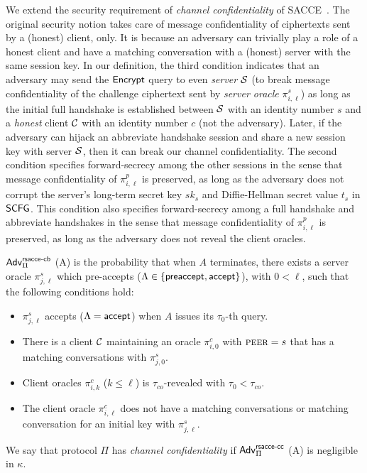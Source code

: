 \begin{remark}
We extend the security requirement of
\textit{channel confidentiality} of SACCE~\cite{KPW13:SACCE}.
The original security notion takes care of message
confidentiality of ciphertexts sent by a (honest)
client, only. It is because an adversary can trivially
play a role of a honest client and have a matching
conversation with a (honest) server with the same
session key. In our definition, the third condition
indicates that an adversary may send the $\mathsf{Encrypt}$
query to even \textit{server} $\mathcal{S}$ (to break
message confidentiality of the challenge ciphertext
sent by \textit{server oracle} $\pi^s_{i,\ell}$) as
long as the initial full handshake is established
between $\mathcal{S}$ with an identity number $s$ and a \textit{honest} client
$\mathcal{C}$ with an identity number $c$ (not the adversary). Later, if the
adversary can hijack an abbreviate handshake session
and share a new session key with server $\mathcal{S}$,
then it can break our channel confidentiality.
The second condition specifies forward-secrecy among
the other sessions in the
sense that message confidentiality of $\pi^p_{i,\ell}$
is preserved, as long as the adversary does not
corrupt the server's long-term secret key $sk_s$ and Diffie-Hellman
secret value $t_s$ in $\mathsf{SCFG}$.
This condition also specifies forward-secrecy among
a full handshake and abbreviate handshakes in the sense
that message confidentiality of $\pi^p_{i,\ell}$ is preserved,
as long as the adversary does not reveal the client oracles.
\end{remark}

\begin{definition} \label{def:rsacce-cb}
 $\mathsf{Adv}^{\mathsf{rsacce\textsc{-} cb}}_{\Pi}$ (A) is the probability that when $A$
 terminates, there exists a server oracle $\pi^s_{j, \ell}$
 which pre-accepts ($\Lambda \in \{\mathsf{preaccept}, \mathsf{accept} \}$), with
 $0< \ell$, such that the following conditions hold:

 \begin{itemize}
  \item{$\pi^s_{j,\ell}$ accepts ($\Lambda=\mathsf{accept}$) when $A$ issues
  its $\tau_0$-th query.}

  \item{There is a client $\mathcal{C}$ maintaining an oracle $\pi^c_{i,0}$ with $\textsc{peer}=s$
  that has a matching conversations with $\pi^s_{j,0}$.}

  \item{Client oracles $\pi^c_{i,k}$
  ($k \leq \ell$) is $\tau_{co}$-revealed with $\tau_0 < \tau_{co}$.}

  \item{The client oracle $\pi^c_{i, \ell}$ does not have a matching conversations
  or matching conversation for an initial key with $\pi^s_{j,\ell}$.}

 \end{itemize}
 We say that protocol $\Pi$ has \textit{channel confidentiality}
 if $\mathsf{Adv}^{\mathsf{rsacce\textsc{-} cc}}_{\Pi}$ (A) is negligible in $\kappa$.
\end{definition}

